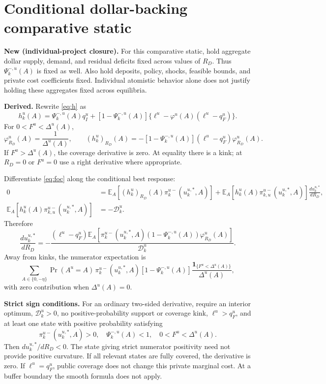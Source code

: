 \documentclass[11pt,a4paper]{article}
\newcommand{\E}{\mathbb E}
\newcommand{\ind}{\mathbf 1}
\newcommand{\newa}{\textbf{New (individual-project closure).}}
\newcommand{\der}{\textbf{Derived.}}
\begin{document}
\section{Conditional dollar-backing comparative static}
\newa{} For this comparative static, hold aggregate dollar supply, demand, and residual deficits fixed across values of $R_D$. Thus $\Psi_k^{-,u}(A)$ is fixed as well. Also hold deposits, policy, shocks, feasible bounds, and private cost coefficients fixed. Individual atomistic behavior alone does not justify holding these aggregates fixed across equilibria.

\der{} Rewrite \eqref{eq:h} as
\begin{equation}
 h_k^u(A)=\Psi_k^{-,u}(A)q_I^u+
 [1-\Psi_k^{-,u}(A)]\{\ell^u-\varphi^u(A)(\ell^u-q_F^u)\}.
\end{equation}
For $0<F^u<\Delta^u(A)$,
\begin{equation}
 \varphi^u_{R_D}(A)=\frac1{\Delta^u(A)},\qquad
 (h_k^u)_{R_D}(A)=-[1-\Psi_k^{-,u}(A)](\ell^u-q_F^u)\varphi^u_{R_D}(A).
\end{equation}
If $F^u>\Delta^u(A)$, the coverage derivative is zero. At equality there is a kink; at $R_D=0$ or $F^u=0$ use a right derivative where appropriate.

Differentiate \eqref{eq:foc} along the conditional best response:
\begin{align}
 0&=\E_A[(h_k^u)_{R_D}(A)\pi_k^{u-}(u_k^{u,*},A)]
 +\E_A[h_k^u(A)\pi_{k,u}^{u-}(u_k^{u,*},A)]\frac{du_k^{u,*}}{dR_D},\\
 \E_A[h_k^u(A)\pi_{k,u}^{u-}(u_k^{u,*},A)]&=-\mathcal D_k^u.
\end{align}
Therefore
\begin{equation}\label{eq:RD}
 \boxed{\frac{du_k^{u,*}}{dR_D}
 =-\frac{(\ell^u-q_F^u)
 \E_A[\pi_k^{u-}(u_k^{u,*},A)(1-\Psi_k^{-,u}(A))\varphi^u_{R_D}(A)]}
 {\mathcal D_k^u}.}
\end{equation}
Away from kinks, the numerator expectation is
\begin{equation}
 \sum_{A\in\{0,-\eta\}}\Pr(A^u=A)\,
 \pi_k^{u-}(u_k^{u,*},A)[1-\Psi_k^{-,u}(A)]
 \frac{\ind_{\{F^u<\Delta^u(A)\}}}{\Delta^u(A)},
\end{equation}
with zero contribution when $\Delta^u(A)=0$.

\textbf{Strict sign conditions.} For an ordinary two-sided derivative, require an interior optimum, $\mathcal D_k^u>0$, no positive-probability support or coverage kink, $\ell^u>q_F^u$, and at least one state with positive probability satisfying
\begin{equation}
 \pi_k^{u-}(u_k^{u,*},A)>0,\quad
 \Psi_k^{-,u}(A)<1,\quad 0<F^u<\Delta^u(A).
\end{equation}
Then $du_k^{u,*}/dR_D<0$. The state giving strict numerator positivity need not provide positive curvature. If all relevant states are fully covered, the derivative is zero. If $\ell^u=q_F^u$, public coverage does not change this private marginal cost. At a buffer boundary the smooth formula does not apply.
\end{document}
